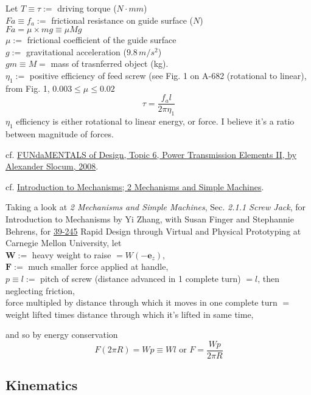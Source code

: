 \documentclass[10pt]{amsart}
\begin{document}
\begin{multicols*}{2}
Let 
$T \equiv \tau := $ driving torque ($N \cdot mm$) \\
$Fa \equiv f_a := $ frictional resistance on guide surface ($N$) \\
$Fa= \mu \times mg \equiv \mu Mg$ \\
$\mu := $ frictional coefficient of the guide surface  \\
$g := $ gravitational acceleration ($9.8 \, m/s^2$)  \\
$gm \equiv M =$ mass of trasnferred object (kg).  \\
$\eta_1 :=$ positive efficiency of feed screw (see Fig. 1 on A-682 (rotational to linear), from Fig. 1, $0.003 \leq \mu \leq 0.02$ 
\begin{equation}
\tau =  \frac{ f_a l }{ 2\pi \eta_1 }
\end{equation}
$\eta_1$ efficiency is either rotational to linear energy, or force.  I believe it's a ratio between magnitude of forces.  


cf. \href{http://web.mit.edu/2.75/fundamentals/FUNdaMENTALs\%20Book\%20pdf/FUNdaMENTALs\%20Topic\%206.PDF}{FUNdaMENTALS of Design, Topic 6, Power Transmission Elements II, by Alexander Slocum, 2008}.  


cf. \href{https://www.cs.cmu.edu/~rapidproto/mechanisms/chpt2.html}{Introduction to Mechanisms; 2 Mechanisms and Simple Machines}.  

Taking a look at \emph{2 Mechanisms and Simple Machines}, Sec. \emph{2.1.1 Screw Jack}, for Introduction to Mechanisms by Yi Zhang, with Susan Finger and Stephannie Behrens, for \href{https://www.cs.cmu.edu/~rapidproto/home.html}{39-245} Rapid Design through Virtual and Physical Prototyping at Carnegie Mellon University, let \\
$\mathbf{W} :=$ heavy weight to raise $= W(-\mathbf{e}_z)$, \\
$\mathbf{F}:=$ much smaller force applied at handle, \\
$p \equiv l :=$ pitch of screw (distance advanced in 1 complete turn) $=l$, then \\
neglecting friction, \\
force multipled by distance through which it moves in one complete turn $=$ weight lifted times distance through which it's lifted in same time, 

and so by energy conservation
\[
F(2\pi R) = Wp \equiv Wl \text{ or } F = \frac{Wp }{2\pi R}
\]

\subsection{Kinematics}


\end{multicols*}
\end{document}
